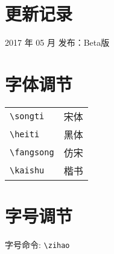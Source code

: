 \documentclass{NJUPTThesis}%
\begin{document}
\section{更新记录}

2017 年 05 月 发布：Beta版
%
%
%
%
%


 \section{字体调节}

\begin{tabular}{ll}
	\verb|\songti|   & {\songti 宋体}   \\
	\verb|\heiti|    & {\heiti 黑体}    \\
	\verb|\fangsong| & {\fangsong 仿宋} \\
	\verb|\kaishu|   & {\kaishu 楷书}
\end{tabular}


\section{字号调节}
字号命令: \verb|\zihao| 
\end{document}

